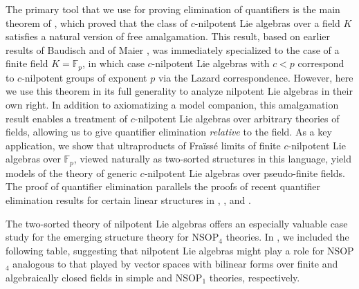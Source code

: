 \documentclass[psamsfonts]{amsart}
\theoremstyle{definition}
\theoremstyle{definition}
\theoremstyle{remark}
\numberwithin{equation}{section}
\begin{document}
The primary tool that we use for proving elimination of quantifiers is the main theorem of \cite{d2023model}, which proved that the class of $c$-nilpotent Lie algebras over a field $K$ satisfies a natural version of free amalgamation.  This result, based on earlier results of Baudisch \cite{Baudisch4} and of Maier \cite{Maierexpp}, was immediately specialized to the case of a finite field $K = \mathbb{F}_{p}$, in which case $c$-nilpotent Lie algebras with $c<p$ correspond to $c$-nilpotent groups of exponent $p$ via the Lazard correspondence. However, here we use this theorem in its full generality to analyze nilpotent Lie algebras in their own right.  In addition to axiomatizing a model companion, this amalgamation result enables a treatment of $c$-nilpotent Lie algebras over arbitrary theories of fields, allowing us to give quantifier elimination \emph{relative} to the field. As a key application, we show that ultraproducts of Fraïssé limits of finite $c$-nilpotent Lie algebras over $\mathbb{F}_{p}$, viewed naturally as two-sorted structures in this language, yield models of the theory of generic $c$-nilpotent Lie algebras over pseudo-finite fields.  The proof of quantifier elimination parallels the proofs of recent quantifier elimination results for certain linear structures in \cite{abdaldaim2023higher}, \cite{ChernikovHempel3}, and \cite{nickandlotte}. 

The two-sorted theory of nilpotent Lie algebras offers an especially valuable case study for the emerging structure theory for NSOP$_{4}$ theories. In \cite{d2023model}, we included the following table, suggesting that nilpotent Lie algebras might play a role for NSOP$_{4}$ analogous to that played by vector spaces with bilinear forms over finite and algebraically closed fields in simple and NSOP$_{1}$ theories, respectively.
\end{document}
